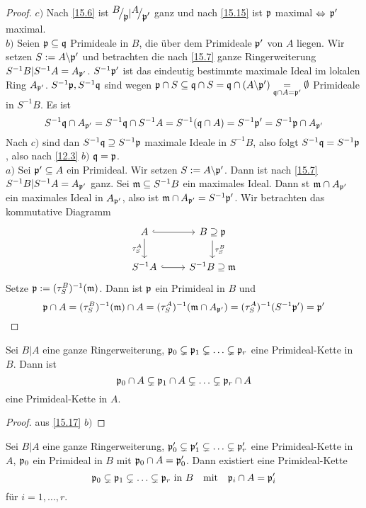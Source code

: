\begin{proof}
	$c)$ Nach \ref{15.6} ist $\QR{B}{\p}| \QR{A}{\p'}$ ganz und nach \ref{15.15} ist $\mathfrak{p}$ maximal $\Leftrightarrow$ $\mathfrak{p}'$ maximal.\\
	$b)$ Seien $\mathfrak{p}\subseteq \mathfrak{q}$ Primideale in $B$, die über dem Primideale $\mathfrak{p}'$ von $A$ liegen. Wir setzen $S:= A\backslash \mathfrak{p}'$ und betrachten die nach \ref{15.7} ganze Ringerweiterung $S^{-1}B |S^{-1} A = A_{\mathfrak{p}'}$. $S^{-1}\mathfrak{p}'$ ist das eindeutig bestimmte maximale Ideal im lokalen Ring $A_{\mathfrak{p}'}$. $S^{-1}\mathfrak{p}, S^{-1}\mathfrak{q}$ sind wegen 
	$\mathfrak{p}\cap S\subseteq \mathfrak{q}\cap S= \mathfrak{q} \cap ( A \backslash \mathfrak{p}') \underset{\mathfrak{q}\cap A = \mathfrak{p}'}{=} \emptyset$ Primideale in $S^{-1}B$. Es ist
	$$S^{-1}\mathfrak{q}\cap A_{\mathfrak{p}'}=S^{-1}\mathfrak{q} \cap S^{-1}A = S^{-1}(\mathfrak{q} \cap A) = S^{-1}\mathfrak{p}'= S^{-1}\mathfrak{p} \cap A_{\mathfrak{p}'}$$
	Nach $c)$ sind dan $S^{-1}\mathfrak{q} \supseteq S^{-1}\mathfrak{p}$ maximale Ideale in $S^{-1}B$, also folgt $S^{-1} \mathfrak{q} = S^{-1}\mathfrak{p}$, also nach \ref{12.3} $b)$ $\mathfrak{q} = \mathfrak{p}$.\\
	$a)$ Sei $\mathfrak{p}' \subseteq A$ ein Primideal. Wir setzen $S:= A \backslash \mathfrak{p}'$. Dann ist nach \ref{15.7} $S^{-1}B|S^{-1}A= A_{\mathfrak{p}'}$ ganz. Sei $\mathfrak{m}\subseteq S^{-1}B$ ein maximales Ideal. Dann st $\mathfrak{m} \cap A_{\mathfrak{p}'}$ ein maximales Ideal in $A_{\mathfrak{p}'}$, also ist $\mathfrak{m} \cap A_{\mathfrak{p}'} = S^{-1}\mathfrak{p}'$. Wir betrachten das kommutative Diagramm
	$$\begin{tikzcd}
	A\arrow[hook]{r} \arrow[swap]{d}{\tau_S^A} & B\arrow{d}{\tau_S^B}\supseteq \p\\
	S^{-1}A \arrow[hook]{r} & S^{-1}B \supseteq \m
	\end{tikzcd}$$
	Setze $\mathfrak{p}:= (\tau_S^B)^{-1}(\mathfrak{m})$. Dann ist $\mathfrak{p}$ ein Primideal in $B$ und $$\mathfrak{p} \cap A=(\tau_S^B)^{-1}(\mathfrak{m}) \cap A = (\tau_S^A)^{-1}( \mathfrak{m} \cap A_{\mathfrak{p}'})= (\tau_S^A)^{-1}(S^{-1} \mathfrak{p}') = \mathfrak{p}'$$
\end{proof}
\begin{fo}\label{15.18}
	Sei $B|A$ eine ganze Ringerweiterung, $\mathfrak{p}_0\subsetneq \mathfrak{p}_1 \subsetneq \ldots \subsetneq \mathfrak{p}_r$ eine Primideal-Kette in $B$. Dann ist 
	$$\mathfrak{p}_0\cap A \subsetneq \mathfrak{p}_1 \cap A \subsetneq \ldots \subsetneq \mathfrak{p}_r \cap A$$
	eine Primideal-Kette in $A$.
\end{fo}
\begin{proof}
	aus \ref{15.17} $b)$
\end{proof}
\begin{fo}
	Sei $B|A$ eine ganze Ringerweiterung, $\mathfrak{p}_0'\subsetneq \mathfrak{p}_1'\subsetneq \ldots \subsetneq \mathfrak{p}_r'$ eine Primideal-Kette in $A$, $\mathfrak{p}_0$ ein Primideal in $B$ mit $\mathfrak{p}_0\cap A = \mathfrak{p}_0'$. Dann existiert eine Primideal-Kette $$\mathfrak{p}_0\subsetneq \mathfrak{p}_1 \subsetneq \ldots \subsetneq \mathfrak{p}_r \text{ in }B \quad\text{mit} \quad \mathfrak{p}_i \cap A = \mathfrak{p}_i'$$ für $i=1, \ldots, r$.
\end{fo}
